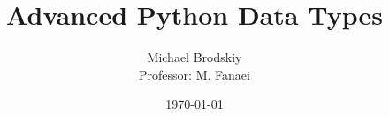 


\title{Advanced Python Data Types}
\date{\today}
\author{Michael Brodskiy\\ \small Professor: M. Fanaei}



\maketitle

